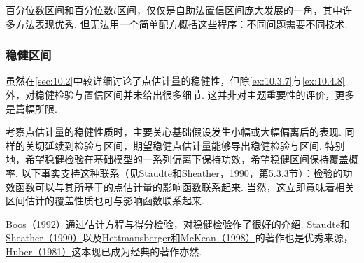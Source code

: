 百分位数区间和百分位数$t$区间，仅仅是自助法置信区间庞大发展的一角，其中许多方法表现优秀. 但无法用一个简单配方概括这些程序：不同问题需要不同技术.

\subsubsection{稳健区间}\label{sec:10.6.6}
虽然在\autoref{sec:10.2}中较详细讨论了点估计量的稳健性，但除\autoref{ex:10.3.7}与\autoref{ex:10.4.8}外，对稳健检验与置信区间并未给出很多细节. 这并非对主题重要性的评价，更多是篇幅所限.

考察点估计量的稳健性质时，主要关心基础假设发生小幅或大幅偏离后的表现. 同样的关切延续到检验与区间，期望稳健点估计量能够导出稳健检验与区间. 特别地，希望稳健检验在基础模型的一系列偏离下保持功效，希望稳健区间保持覆盖概率. 以下事实支持这种联系（见\hyperref[bib:source299]{Staudte和Sheather，1990}，第5.3.3节）：检验的功效函数可以与其所基于的点估计量的影响函数联系起来. 当然，这立即意味着相关区间估计的覆盖性质也可与影响函数联系起来.

\hyperref[bib:source41]{Boos（1992）}通过估计方程与得分检验，对稳健检验作了很好的介绍. \hyperref[bib:source299]{Staudte和Sheather（1990）}以及\hyperref[bib:source165]{Hettmansberger和McKean（1998）}的著作也是优秀来源，\hyperref[bib:source171]{Huber（1981）}这本现已成为经典的著作亦然.
